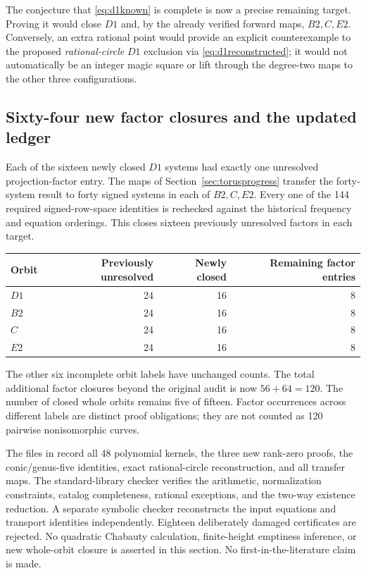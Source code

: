 \documentclass[11pt,letterpaper]{article}
\theoremstyle{definition}\newtheorem{definition}[theorem]{Definition}
\theoremstyle{remark}\newtheorem{remark}[theorem]{Remark}
\begin{document}
The conjecture that \eqref{eq:d1known} is complete is now a precise remaining target. Proving it would close $D1$ and, by the already verified forward maps, $B2,C,E2$. Conversely, an extra rational point would provide an explicit counterexample to the proposed \emph{rational-circle} $D1$ exclusion via \eqref{eq:d1reconstructed}; it would not automatically be an integer magic square or lift through the degree-two maps to the other three configurations.

\subsection{Sixty-four new factor closures and the updated ledger}
Each of the sixteen newly closed $D1$ systems had exactly one unresolved projection-factor entry. The maps of Section~\ref{sec:torusprogress} transfer the forty-system result to forty signed systems in each of $B2,C,E2$. Every one of the 144 required signed-row-space identities is rechecked against the historical frequency and equation orderings. This closes sixteen previously unresolved factors in each target.
\begin{center}
\begin{tabular}{lrrr}
\toprule
Orbit & Previously unresolved & Newly closed & Remaining factor entries\\
\midrule
$D1$ &24&16&8\\
$B2$ &24&16&8\\
$C$  &24&16&8\\
$E2$ &24&16&8\\
\bottomrule
\end{tabular}
\end{center}
The other six incomplete orbit labels have unchanged counts. The total additional factor closures beyond the original audit is now $56+64=120$. The number of closed whole orbits remains five of fifteen. Factor occurrences across different labels are distinct proof obligations; they are not counted as 120 pairwise nonisomorphic curves.

The files in  record all 48 polynomial kernels, the three new rank-zero proofs, the conic/genus-five identities, exact rational-circle reconstruction, and all transfer maps. The standard-library checker verifies the arithmetic, normalization constraints, catalog completeness, rational exceptions, and the two-way existence reduction. A separate symbolic checker reconstructs the input equations and transport identities independently. Eighteen deliberately damaged certificates are rejected. No quadratic Chabauty calculation, finite-height emptiness inference, or new whole-orbit closure is asserted in this section. No first-in-the-literature claim is made.
\end{document}
